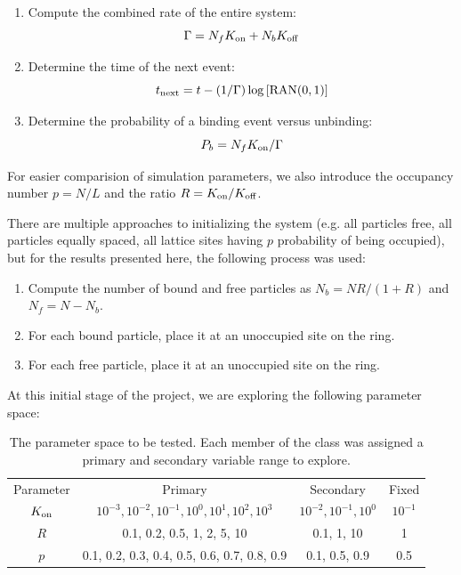 \documentclass[12pt]{article}
\begin{document}
\begin{enumerate}
    \item Compute the combined rate of the entire system:
    \begin{equation}
        \Gamma = N_f K_{\rm on} + N_b K_{\rm off}
    \end{equation}
    \item Determine the time of the next event:
    \begin{equation}
        t_{\rm next} = t - (1/\Gamma) \log{[\rm RAN(0,1)]}
    \end{equation}
    \item Determine the probability of a binding event versus unbinding:
    \begin{equation}
        P_b = N_f K_{\rm on} / \Gamma
    \end{equation}
\end{enumerate}

For easier comparision of simulation parameters, we also introduce the occupancy number $p = N / L$ and the ratio $R = K_{\rm on} / K_{\rm off}$.


There are multiple approaches to initializing the system (e.g. all particles free, all particles equally spaced, all lattice sites having $p$ probability of being occupied), but for the results presented here, the following process was used:
\begin{enumerate}
    \item Compute the number of bound and free particles as $N_b = N R / (1+R)$ and $N_f = N - N_b$.
    \item For each bound particle, place it at an unoccupied site on the ring.
    \item For each free particle, place it at an unoccupied site on the ring.
\end{enumerate}

At this initial stage of the project, we are exploring the following parameter space:

\begin{table}[!h]
\begin{center}
\begin{tabular}{c c c c}
    Parameter & Primary & Secondary & Fixed \\
    $K_{\rm on}$ & $10^{-3}, 10^{-2}, 10^{-1}, 10^0, 10^1, 10^2, 10^3$ & $10^{-2}, 10^{-1}, 10^0$ & $10^{-1}$ \\
    $R$ & 0.1, 0.2, 0.5, 1, 2, 5, 10 & 0.1, 1, 10 & 1 \\
    $p$ & 0.1, 0.2, 0.3, 0.4, 0.5, 0.6, 0.7, 0.8, 0.9 & 0.1, 0.5, 0.9 & 0.5 \\
\end{tabular}
\caption{The parameter space to be tested. Each member of the class was assigned a primary and secondary variable range to explore.}
\end{center}
\end{table}
\end{document}
